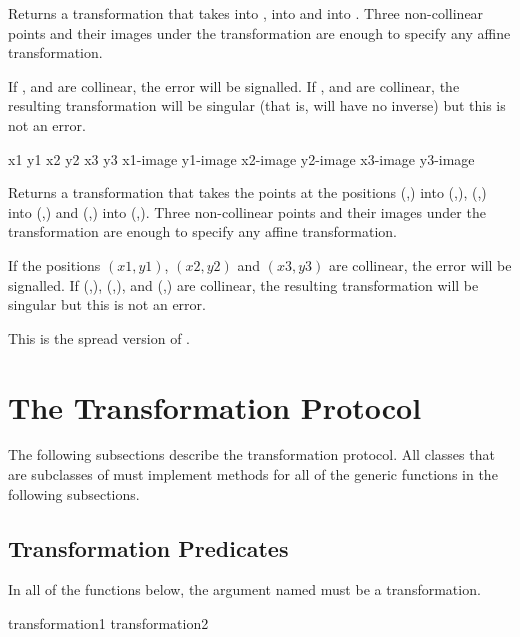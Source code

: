 Returns a transformation that takes   into
,  into  and 
into .  Three non-collinear points and their images under the
transformation are enough to specify any affine transformation.

If ,  and  are collinear, the
 error will be signalled.  If
,  and  are collinear,
the resulting transformation will be singular (that is, will have no inverse)
but this is not an error.


 {x1 y1 x2 y2 x3 y3 x1-image y1-image x2-image y2-image x3-image y3-image}

Returns a transformation that takes the points at the positions
(,) into (,), (,)
into (,) and (,) into
(,).  Three non-collinear points and their images
under the transformation are enough to specify any affine transformation.

If the positions $(x1,y1)$, $(x2,y2)$ and $(x3,y3)$ are collinear, the
 error will be signalled.  If
(,), (,), and
(,) are collinear, the resulting transformation will
be singular but this is not an error.

This is the spread version of .


\section {The Transformation Protocol}

The following subsections describe the transformation protocol.  All classes
that are subclasses of  must implement methods for all of
the generic functions in the following subsections.


\subsection {Transformation Predicates}

In all of the functions below, the argument named  must be a
transformation.

 {transformation1 transformation2} 

